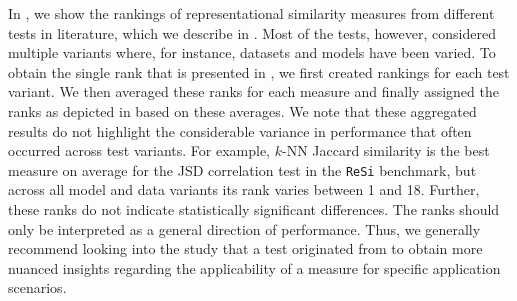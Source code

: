 \documentclass{article}
\begin{document}
\begin{refsegment}
In , we show the rankings of representational similarity measures from different tests in literature, which we describe in .
Most of the tests, however, considered multiple variants where, for instance, datasets and models have been varied.
To obtain the single rank that is presented in , we first created rankings for each test variant.
We then averaged these ranks for each measure and finally assigned the ranks as depicted in  based on these averages.
We note that these aggregated results do not highlight the considerable variance in performance that often occurred across test variants.
For example, $k$-NN Jaccard similarity is the best measure on average for the JSD correlation test in the \texttt{ReSi} benchmark, but across all model and data variants its rank varies between 1 and 18.
Further, these ranks do not indicate statistically significant differences.
The ranks should only be interpreted as a general direction of performance.
Thus, we generally recommend looking into the study that a test originated from to obtain more nuanced insights regarding the applicability of a measure for specific application scenarios.


\end{refsegment}
\end{document}
